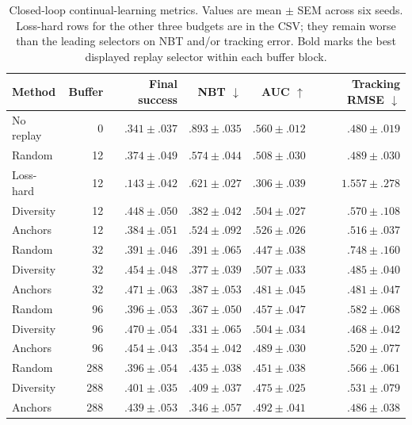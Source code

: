 \documentclass[11pt]{article}
\begin{document}
\begin{table}[H]
\centering
\small
\begin{tabular}{lrrrrr}
\toprule
Method & Buffer & Final success & NBT $\downarrow$ & AUC $\uparrow$ & Tracking RMSE $\downarrow$ \\
\midrule
No replay & 0 & $.341\pm.037$ & $.893\pm.035$ & $.560\pm.012$ & $.480\pm.019$ \\
Random & 12 & $.374\pm.049$ & $.574\pm.044$ & $.508\pm.030$ & $.489\pm.030$ \\
Loss-hard & 12 & $.143\pm.042$ & $.621\pm.027$ & $.306\pm.039$ & $1.557\pm.278$ \\
Diversity & 12 & $\mathbf{.448}\pm.050$ & $\mathbf{.382}\pm.042$ & $.504\pm.027$ & $.570\pm.108$ \\
Anchors & 12 & $.384\pm.051$ & $.524\pm.092$ & $\mathbf{.526}\pm.026$ & $.516\pm.037$ \\
\midrule
Random & 32 & $.391\pm.046$ & $.391\pm.065$ & $.447\pm.038$ & $.748\pm.160$ \\
Diversity & 32 & $.454\pm.048$ & $\mathbf{.377}\pm.039$ & $\mathbf{.507}\pm.033$ & $.485\pm.040$ \\
Anchors & 32 & $\mathbf{.471}\pm.063$ & $.387\pm.053$ & $.481\pm.045$ & $\mathbf{.481}\pm.047$ \\
\midrule
Random & 96 & $.396\pm.053$ & $.367\pm.050$ & $.457\pm.047$ & $.582\pm.068$ \\
Diversity & 96 & $\mathbf{.470}\pm.054$ & $\mathbf{.331}\pm.065$ & $\mathbf{.504}\pm.034$ & $\mathbf{.468}\pm.042$ \\
Anchors & 96 & $.454\pm.043$ & $.354\pm.042$ & $.489\pm.030$ & $.520\pm.077$ \\
\midrule
Random & 288 & $.396\pm.054$ & $.435\pm.038$ & $.451\pm.038$ & $.566\pm.061$ \\
Diversity & 288 & $.401\pm.035$ & $.409\pm.037$ & $.475\pm.025$ & $.531\pm.079$ \\
Anchors & 288 & $\mathbf{.439}\pm.053$ & $\mathbf{.346}\pm.057$ & $\mathbf{.492}\pm.041$ & $\mathbf{.486}\pm.038$ \\
\bottomrule
\end{tabular}
\caption{Closed-loop continual-learning metrics. Values are mean $\pm$ SEM across six seeds. Loss-hard rows for the other three budgets are in the CSV; they remain worse than the leading selectors on NBT and/or tracking error. Bold marks the best displayed replay selector within each buffer block.}
\label{tab:results}
\end{table}
\end{document}
